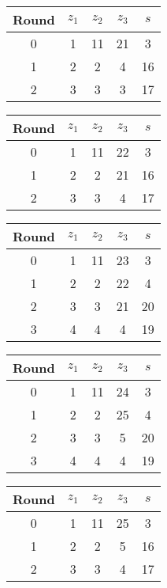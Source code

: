 \begin{table}
\begin{tabular}{c | c | c | c | c }
Round & $z_1$ & $z_2$ & $z_3$ & $s$ \\
\hline
0 & 1 & 11 & 21 & 3 \\
1 & 2 & 2 & 4 & 16 \\
2 & 3 & 3 & 3 & 17
\end{tabular}
\end{table}

\begin{table}
\begin{tabular}{c | c | c | c | c }
Round & $z_1$ & $z_2$ & $z_3$ & $s$ \\
\hline
0 & 1 & 11 & 22 & 3 \\
1 & 2 & 2 & 21 & 16 \\
2 & 3 & 3 & 4 & 17
\end{tabular}
\end{table}

\begin{table}
\begin{tabular}{c | c | c | c | c }
Round & $z_1$ & $z_2$ & $z_3$ & $s$ \\
\hline
0 & 1 & 11 & 23 & 3 \\
1 & 2 & 2 & 22 & 4 \\
2 & 3 & 3 & 21 & 20 \\
3 & 4 & 4 & 4 & 19
\end{tabular}
\end{table}

\begin{table}
\begin{tabular}{c | c | c | c | c }
Round & $z_1$ & $z_2$ & $z_3$ & $s$ \\
\hline
0 & 1 & 11 & 24 & 3 \\
1 & 2 & 2 & 25 & 4 \\
2 & 3 & 3 & 5 & 20 \\
3 & 4 & 4 & 4 & 19
\end{tabular}
\end{table}

\begin{table}
\begin{tabular}{c | c | c | c | c }
Round & $z_1$ & $z_2$ & $z_3$ & $s$ \\
\hline
0 & 1 & 11 & 25 & 3 \\
1 & 2 & 2 & 5 & 16 \\
2 & 3 & 3 & 4 & 17
\end{tabular}
\end{table}

